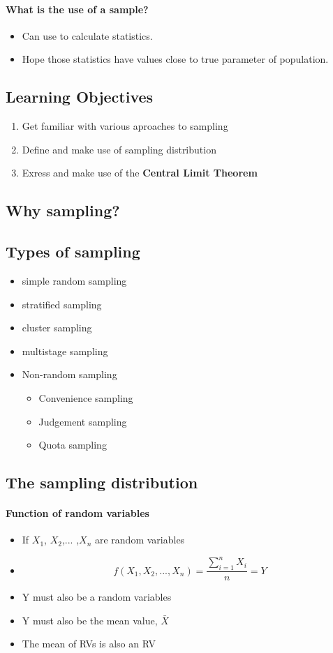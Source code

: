 \documentclass[11pt]{article} %
\begin{document}
\paragraph{What is the use of a sample?}
\begin{itemize}
    \item Can use to calculate statistics.
    \item Hope those statistics have values close to true parameter of population.
\end{itemize}
% 
% 
% 
\subsection{Learning Objectives}
\begin{enumerate}
    \item Get familiar with various aproaches to sampling
    \item Define and make use of sampling distribution
    \item Exress and make use of the \textbf{Central Limit Theorem}
\end{enumerate}
% 
% 
% 
% 
% 
\subsection{Why sampling?}
\subsection{Types of sampling}
\begin{itemize}
    \item simple random sampling
    \item stratified sampling
    \item cluster sampling
    \item multistage sampling
    \item Non-random sampling
          \begin{itemize}
              \item Convenience sampling
              \item Judgement sampling
              \item Quota sampling
          \end{itemize}
\end{itemize}
% 
% 
\subsection{The sampling distribution}
\paragraph{Function of random variables}
\begin{itemize}
    \item If $X_1$, $X_2$,... ,$X_n$ are random variables
    \item $$ f(X_1, X_2,... ,X_n)=\frac{\sum_{i=1}^{n}X_i}{n}=Y $$
    \item Y must also be a random variables
    \item Y must also be the mean value, $\bar{X}$
    \item The mean of RVs is also an RV
\end{itemize}
% 
% 
% 
\end{document}

